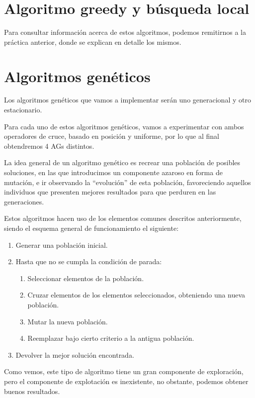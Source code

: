 \newpage

\section{Algoritmo greedy y búsqueda local}

Para consultar información acerca de estos algoritmos, podemos remitirnos a la práctica anterior, donde se explican en detalle los mismos.

\section{Algoritmos genéticos}

Los algoritmos genéticos que vamos a implementar serán uno generacional y otro estacionario.

Para cada uno de estos algoritmos genéticos, vamos a experimentar con ambos operadores de cruce, basado en posición y uniforme, por lo que al final obtendremos 4 AGs distintos.

La idea general de un algoritmo genético es recrear una población de posibles soluciones, en las que introducimos un componente azaroso en forma de mutación, e ir observando la ``evolución'' de esta población, favoreciendo aquellos individuos que presenten mejores resultados para que perduren en las generaciones.

Estos algoritmos hacen uso de los elementos comunes descritos anteriormente, siendo el esquema general de funcionamiento el siguiente:

\begin{enumerate}
\item Generar una población inicial.
\item Hasta que no se cumpla la condición de parada:
    \begin{enumerate}
    \item Seleccionar elementos de la población.
    \item Cruzar elementos de los elementos seleccionados, obteniendo una nueva población.
    \item Mutar la nueva población.
    \item Reemplazar bajo cierto criterio a la antigua población.
    \end{enumerate}
\item Devolver la mejor solución encontrada.
\end{enumerate}

Como vemos, este tipo de algoritmo tiene un gran componente de exploración, pero el componente de explotación es inexistente, no obstante, podemos obtener buenos resultados.

